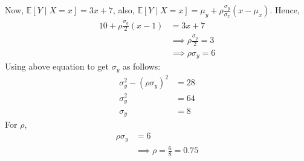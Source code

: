 \documentclass[a4paper]{article}
\begin{document}
Now, $\mathbb{E}\left[ Y \mid X = x \right] = 3x+7$, also, $\mathbb{E}\left[ Y \mid X = x \right] = \mu_y + \rho \frac{\sigma_y}{\sigma_x}\left( x - \mu_x \right) $.
\newline\newline
Hence,
\begin{equation*}
	\begin{split}
		10 + \rho \frac{\sigma_y}{2} \left( x - 1 \right) &= 3x+7\\
		&\implies \rho \frac{\sigma_y}{2} = 3\\
		&\implies\rho\sigma_y = 6
	\end{split}
\end{equation*}
Using above equation to get $\sigma_y$ as follows:
 \begin{equation*}
\begin{split}
		\sigma_y^2 - \left( \rho\sigma_y \right) ^2 &=  28\\
	\sigma_y^2 &=  64\\
	\sigma_y &=  8
\end{split}
\end{equation*}
For $\rho$,
 \begin{equation*}
	\begin{split}
		\rho\sigma_y &= 6\\
		&\implies \rho = \frac{6}{8} = 0.75
	\end{split}
\end{equation*}
\end{document}
